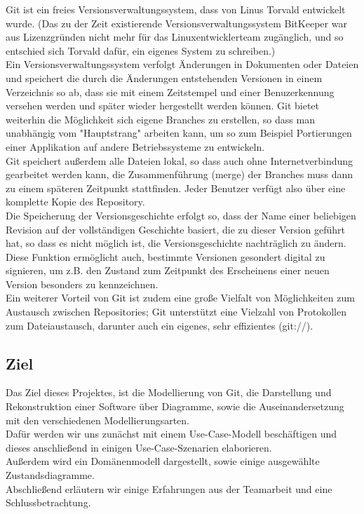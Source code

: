 \documentclass[a4paper]{article}
\begin{document}
Git ist ein freies Versionsverwaltungssystem, dass von Linus Torvald entwickelt wurde.
(Das zu der Zeit existierende Versionsverwaltungssystem BitKeeper war aus Lizenzgründen nicht mehr für das Linuxentwicklerteam zugänglich, und so entschied sich Torvald dafür, ein eigenes System zu schreiben.) \\
Ein Versionsverwaltungssystem verfolgt Änderungen in Dokumenten oder Dateien und speichert die durch die Änderungen entstehenden Versionen in einem Verzeichnis so ab, dass sie mit einem Zeitstempel und einer Benuzerkennung versehen werden und später wieder hergestellt werden können. Git bietet weiterhin die Möglichkeit sich eigene \gls{Branch}es zu erstellen, so dass man unabhängig vom "Hauptstrang" arbeiten kann, um so zum Beispiel Portierungen einer Applikation auf andere Betriebssysteme zu entwickeln. \\
Git speichert außerdem alle Dateien lokal, so dass auch ohne Internetverbindung gearbeitet werden kann, die Zusammenführung (\gls{merge}) der Branches muss dann zu einem späteren Zeitpunkt stattfinden. Jeder Benutzer verfügt also über eine komplette Kopie des \gls{Repository}. \\
Die Speicherung der Versionsgeschichte erfolgt so, dass der Name einer beliebigen Revision auf der vollständigen Geschichte basiert, die zu dieser Version geführt hat, so dass es nicht möglich ist, die Versionsgeschichte nachträglich zu ändern. Diese Funktion ermöglicht auch, bestimmte Versionen gesondert digital zu signieren, um z.B. den Zustand zum Zeitpunkt des Erscheinens einer neuen Version besonders zu kennzeichnen. \\
Ein weiterer Vorteil von Git ist zudem eine große Vielfalt von Möglichkeiten zum Austausch zwischen Repositories; Git unterstützt eine Vielzahl von Protokollen zum Dateiaustausch, darunter auch ein eigenes, sehr effizientes (git://).\\


\subsection{Ziel}
	Das Ziel dieses Projektes, ist die Modellierung von Git, die Darstellung und Rekonstruktion einer Software über Diagramme, sowie die Auseinandersetzung mit den verschiedenen Modellierungsarten. \\
	Dafür werden wir uns zunächst mit einem Use-Case-Modell beschäftigen und dieses anschließend in einigen Use-Case-Szenarien elaborieren. \\
	Außerdem wird ein Domänenmodell dargestellt, sowie einige ausgewählte Zustandsdiagramme.\\
	Abschließend erläutern wir einige Erfahrungen aus der Teamarbeit und eine Schlussbetrachtung.
\newpage												%
\end{document}
